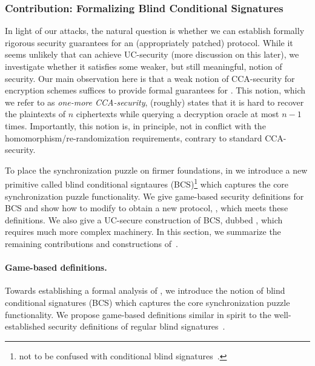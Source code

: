 \subsubsection{Contribution: Formalizing Blind Conditional Signatures}\label{sec:bcs}

In light of our attacks, the natural question is whether we can establish formally rigorous security guarantees for an (appropriately patched) \AAL protocol. While it seems unlikely that \AAL can achieve UC-security (more discussion on this later), we investigate whether it satisfies some weaker, but still meaningful, notion of security. Our main observation here is that a weak notion of CCA-security for encryption schemes suffices to provide formal guarantees for \AAL. This notion, which we refer to as \emph{one-more CCA-security}, (roughly) states that it is hard to recover the plaintexts of $n$ ciphertexts while querying a decryption oracle at most $n-1$ times. Importantly, this notion is, in principle, not in conflict with the homomorphism/re-randomization requirements, contrary to standard CCA-security.

To place the synchronization puzzle on firmer foundations, in \cite{CCS:GMMMTT22} we introduce a new primitive called blind conditional signtaures (BCS)\footnote{not to be confused with conditional blind signatures~\cite{EPRINT:ZacGroPag17}.} which captures the core synchronization puzzle functionality. We give game-based security definitions for BCS and show how to modify \AAL to obtain a new protocol, \AALplus, which meets these definitions. We also give a UC-secure construction of BCS, dubbed \AALUC, which requires much more complex machinery. In this section, we summarize the remaining contributions and constructions of~\cite{CCS:GMMMTT22}. 

\paragraph{Game-based definitions.} Towards establishing a formal analysis of \AAL, we introduce the notion of blind conditional signatures (BCS) which captures the core synchronization puzzle functionality. We propose game-based definitions similar in spirit to the well-established security definitions of regular blind signatures~\cite{C:Chaum82,JC:SchUnr17}. 

